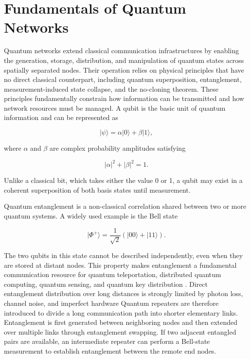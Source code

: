 \section{Fundamentals of Quantum Networks}
Quantum networks extend classical communication infrastructures by enabling the generation, storage, distribution, and manipulation of quantum states across spatially separated nodes. Their operation relies on physical principles that have no direct classical counterpart, including quantum superposition, entanglement, measurement-induced state collapse, and the no-cloning theorem. These principles fundamentally constrain how information can be transmitted and how network resources must be managed.
\cite{kimble2008quantum,wehner2018vision}
A qubit is the basic unit of quantum information and can be represented as

\begin{equation}
    |\psi\rangle = \alpha |0\rangle + \beta |1\rangle,
\end{equation}

where $\alpha$ and $\beta$ are complex probability amplitudes satisfying

\begin{equation}
    |\alpha|^2 + |\beta|^2 = 1.
\end{equation}

Unlike a classical bit, which takes either the value 0 or 1, a qubit may exist in a coherent superposition of both basis states until measurement.

Quantum entanglement is a non-classical correlation shared between two or more quantum systems. A widely used example is the Bell state

\begin{equation}
    |\Phi^{+}\rangle =
    \frac{1}{\sqrt{2}}
    \left(
    |00\rangle + |11\rangle
    \right).
\end{equation}

The two qubits in this state cannot be described independently, even when they are stored at distant nodes. This property makes entanglement a fundamental communication resource for quantum teleportation, distributed quantum computing, quantum sensing, and quantum key distribution \cite{kimble2008quantum,wehner2018vision}.
Direct entanglement distribution over long distances is strongly limited by photon loss, channel noise, and imperfect hardware \cite{briegel1998quantum,pant2019routing} Quantum repeaters are therefore introduced to divide a long communication path into shorter elementary links. Entanglement is first generated between neighboring nodes and then extended over multiple links through entanglement swapping. If two adjacent entangled pairs are available, an intermediate repeater can perform a Bell-state measurement to establish entanglement between the remote end nodes.

